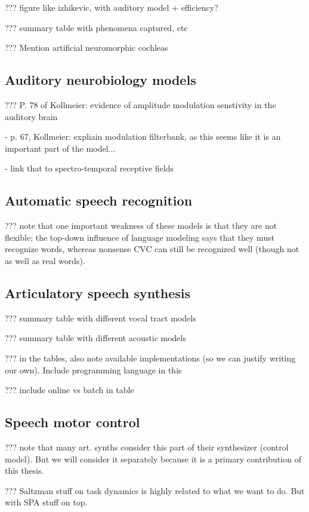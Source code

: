 ??? figure like izhikevic, with auditory model + efficiency?

??? summary table with phenomena captured, etc

??? Mention artificial neuromorphic cochleas

\subsection{Auditory neurobiology models}

??? P. 78 of Kollmeier: evidence of amplitude modulation senstivity
in the auditory brain

- p. 67, Kollmeier: expliain modulation filterbank,
  as this seems like it is an important part of the model...

- link that to spectro-temporal receptive fields

\subsection{Automatic speech recognition}

??? note that one important weakness of these models
is that they are not flexible; the top-down influence
of language modeling says that they must recognize words,
whereas nonsense CVC can still be recognized well
(though not as well as real words).

\subsection{Articulatory speech synthesis}

??? summary table with different vocal tract models

??? summary table with different acoustic models

??? in the tables, also note available implementations
(so we can justify writing our own).
Include programming language in this

??? include online vs batch in table

\subsection{Speech motor control}

??? note that many art. synths consider this part of their
synthesizer (control model).
But we will consider it separately because
it is a primary contribution of this thesis.

??? Saltzman stuff on task dynamics
is highly related to what we want to do.
But with SPA stuff on top.

